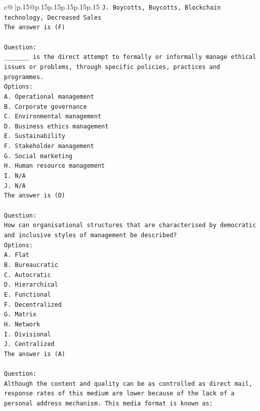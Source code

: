 \documentclass{article}
\begin{document}
{\begin{supertabular}{c@{$\;$}|p{.15\linewidth}@{}p{.15\linewidth}p{.15\linewidth}p{.15\linewidth}p{.15\linewidth}p{.15\linewidth}}
{{{\texttt{J. Boycotts, Buycotts, Blockchain technology, Decreased Sales} \\
\texttt{The answer is (F)} \\
\\ 
\texttt{Question:} \\
\texttt{\_\_\_\_\_\_\_ is the direct attempt to formally or informally manage ethical issues or problems, through specific policies, practices and programmes.} \\
\texttt{Options:} \\
\texttt{A. Operational management} \\
\texttt{B. Corporate governance} \\
\texttt{C. Environmental management} \\
\texttt{D. Business ethics management} \\
\texttt{E. Sustainability} \\
\texttt{F. Stakeholder management} \\
\texttt{G. Social marketing} \\
\texttt{H. Human resource management} \\
\texttt{I. N/A} \\
\texttt{J. N/A} \\
\texttt{The answer is (D)} \\
\\ 
\texttt{Question:} \\
\texttt{How can organisational structures that are characterised by democratic and inclusive styles of management be described?} \\
\texttt{Options:} \\
\texttt{A. Flat} \\
\texttt{B. Bureaucratic} \\
\texttt{C. Autocratic} \\
\texttt{D. Hierarchical} \\
\texttt{E. Functional} \\
\texttt{F. Decentralized} \\
\texttt{G. Matrix} \\
\texttt{H. Network} \\
\texttt{I. Divisional} \\
\texttt{J. Centralized} \\
\texttt{The answer is (A)} \\
\\ 
\texttt{Question:} \\
\texttt{Although the content and quality can be as controlled as direct mail, response rates of this medium are lower because of the lack of a personal address mechanism. This media format is known as:} \\
}}}
\end{supertabular}}
\end{document}
